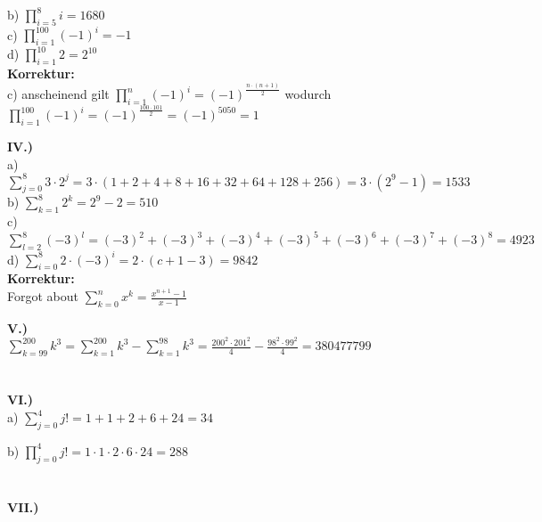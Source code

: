 \documentclass[12pt]{scrartcl}
\begin{document}
b)
$\displaystyle{\prod_{i=5}^{8} i} = 1680$\\

c)
$\displaystyle{\prod_{i=1}^{100} (-1)^i} = -1$\\

d)
$\displaystyle{\prod_{i=1}^{10} 2} = 2^{10}$\\

\textbf{Korrektur:}\\
c) anscheinend gilt $\displaystyle{\prod_{i=1}^{n} (-1)^i = (-1)^\frac{n \cdot (n+1)}{2}}$ wodurch\\
$\displaystyle{\prod_{i=1}^{100} (-1)^i = (-1)^\frac{100 \cdot 101}{2}} = (-1)^{5050} = 1$


\newpage
\textbf{IV.)}\\
a)
$\displaystyle{\sum_{j=0}^{8} 3 \cdot 2^j} = 3 \cdot (1 + 2 + 4 + 8 + 16 + 32 + 64 + 128 + 256) = 3 \cdot (2^9 - 1) = 1533$\\

b)
$\displaystyle{\sum_{k=1}^{8} 2^k} = 2^9 - 2 = 510$\\

c)
$\displaystyle{\sum_{l=2}^{8} (-3)^l} = (-3)^2 + (-3)^3 + (-3)^4 + (-3)^5 + (-3)^6 + (-3)^7 + (-3)^8 = 4923$\\

d)
$\displaystyle{\sum_{i=0}^{8} 2 \cdot (-3)^i} = 2 \cdot (c + 1 - 3) = 9842$\\


\textbf{Korrektur:}\\

Forgot about $\sum_{k=0}^{n} x^k = \frac{x^{n+1} - 1}{x - 1}$

\newpage
\textbf{V.)}\\

$\displaystyle{\sum_{k=99}^{200} k^3} = \sum_{k=1}^{200} k^3 - \sum_{k=1}^{98} k^3 = \frac{200^2 \cdot 201^2}{4} - \frac{98^2 \cdot 99^2}{4} = 380477799$\\
\\
\\


\textbf{VI.)}\\

a) $\displaystyle{\sum_{j=0}^{4} j! = 1 + 1 + 2 + 6 + 24 = 34}$

b) $\displaystyle{\prod_{j=0}^{4} j! = 1 \cdot 1 \cdot 2 \cdot 6 \cdot 24 = 288 }$\\
\\
\\


\textbf{VII.)}\\
\end{document}
